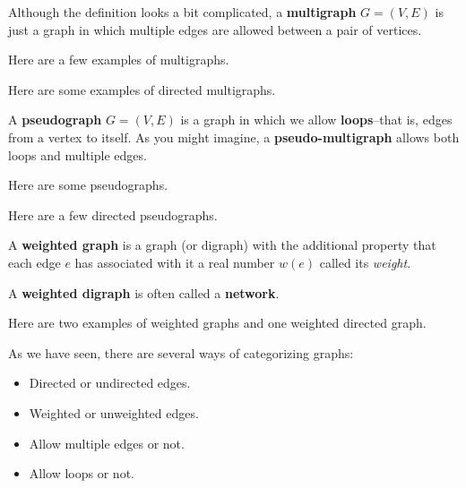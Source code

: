 Although the definition looks a bit complicated, 
a {\bf multigraph} $G=(V,E)$ is just a graph in which multiple
edges are allowed between a pair of vertices.

\begin{exa}
Here are a few examples of multigraphs.
\begin{center}
\end{center}
Here are some examples of directed multigraphs.
\begin{center}
\end{center}
\end{exa}



\begin{df}
A {\bf pseudograph} $G=(V,E)$ is a graph in which we 
allow {\bf loops}--that is, edges from a vertex to itself.  
As you might imagine, a {\bf pseudo-multigraph} allows both loops
and multiple edges.
\end{df}

\begin{exa}
Here are some pseudographs.
\begin{center}
\end{center}
Here are a few directed pseudographs.
\begin{center}
\end{center}
\end{exa}


\begin{df}
A {\bf weighted graph} is a graph (or digraph) with the additional
property that each edge $e$
has associated with it a real number $w(e)$ called its {\em weight}.

A {\bf weighted digraph} is often called a {\bf network}.
\end{df}

\begin{exa}
Here are two examples of weighted graphs and one weighted directed graph.
\begin{center}
\hspace*{.5in}
\end{center}
\end{exa}

As we have seen, there are several ways of categorizing graphs:
\begin{itemize}
\item
Directed or undirected edges.
\item
Weighted or unweighted edges.
\item
Allow multiple edges or not.
\item
Allow loops or not.
\end{itemize}

